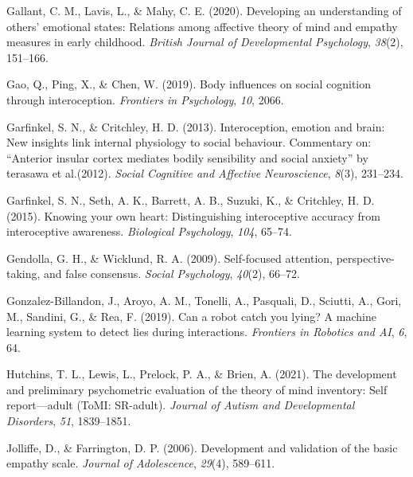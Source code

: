 \documentclass[
  man,mask,floatsintext]{apa6}
\newlength{\cslhangindent}
\newlength{\cslentryspacingunit} %
\newenvironment{CSLReferences}[2] %
 {%
  \setlength{\parindent}{0pt}
  \ifodd #1
  \let\oldpar\par
  \def\par{\hangindent=\cslhangindent\oldpar}
  \fi
  \setlength{\parskip}{#2\cslentryspacingunit}
 }%
 {}
\begin{document}
\begin{CSLReferences}{1}{0}
\leavevmode{}%
Gallant, C. M., Lavis, L., \& Mahy, C. E. (2020). Developing an understanding of others' emotional states: Relations among affective theory of mind and empathy measures in early childhood. \emph{British Journal of Developmental Psychology}, \emph{38}(2), 151--166.

\leavevmode{}%
Gao, Q., Ping, X., \& Chen, W. (2019). Body influences on social cognition through interoception. \emph{Frontiers in Psychology}, \emph{10}, 2066.

\leavevmode{}%
Garfinkel, S. N., \& Critchley, H. D. (2013). Interoception, emotion and brain: New insights link internal physiology to social behaviour. Commentary on: {``Anterior insular cortex mediates bodily sensibility and social anxiety''} by terasawa et al.(2012). \emph{Social Cognitive and Affective Neuroscience}, \emph{8}(3), 231--234.

\leavevmode{}%
Garfinkel, S. N., Seth, A. K., Barrett, A. B., Suzuki, K., \& Critchley, H. D. (2015). Knowing your own heart: Distinguishing interoceptive accuracy from interoceptive awareness. \emph{Biological Psychology}, \emph{104}, 65--74.

\leavevmode{}%
Gendolla, G. H., \& Wicklund, R. A. (2009). Self-focused attention, perspective-taking, and false consensus. \emph{Social Psychology}, \emph{40}(2), 66--72.

\leavevmode{}%
Gonzalez-Billandon, J., Aroyo, A. M., Tonelli, A., Pasquali, D., Sciutti, A., Gori, M., Sandini, G., \& Rea, F. (2019). Can a robot catch you lying? A machine learning system to detect lies during interactions. \emph{Frontiers in Robotics and AI}, \emph{6}, 64.

\leavevmode{}%
Hutchins, T. L., Lewis, L., Prelock, P. A., \& Brien, A. (2021). The development and preliminary psychometric evaluation of the theory of mind inventory: Self report---adult (ToMI: SR-adult). \emph{Journal of Autism and Developmental Disorders}, \emph{51}, 1839--1851.

\leavevmode{}%
Jolliffe, D., \& Farrington, D. P. (2006). Development and validation of the basic empathy scale. \emph{Journal of Adolescence}, \emph{29}(4), 589--611.


\end{CSLReferences}
\end{document}
